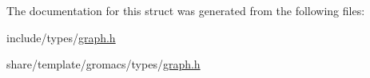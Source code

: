 \-The documentation for this struct was generated from the following files\-:\begin{DoxyCompactItemize}
\item 
include/types/\hyperlink{include_2types_2graph_8h}{graph.\-h}\item 
share/template/gromacs/types/\hyperlink{share_2template_2gromacs_2types_2graph_8h}{graph.\-h}\end{DoxyCompactItemize}

